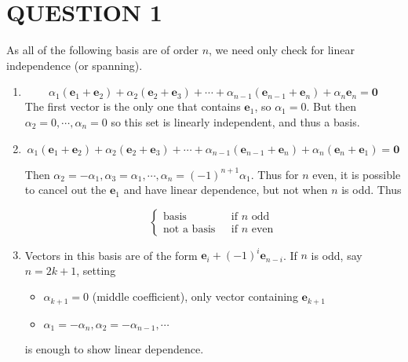 \documentclass[a4paper]{article}
\begin{document}
	
	\maketitle
	
	\section{QUESTION 1}
	
	As all of the following basis are of order $ n $, we need only check for linear independence (or spanning).
	
	\begin{enumerate}[label = (\alph*)]
		\item  \[ \alpha_{1} (\mathbf{e}_{1} + \mathbf{e}_{2}) + \alpha_{2} (\mathbf{e}_{2} + \mathbf{e}_{3}) + \cdots + \alpha_{n-1} ( \mathbf{e}_{n-1} + \mathbf{e}_{n}) + \alpha_{n} \mathbf{e}_{n} = \mathbf{0}  \]
		The first vector is the only one that contains $ \mathbf{e}_{1} $, so $ \alpha_{1} = 0 $. But then $ \alpha_{2} = 0, \cdots, \alpha_{n} = 0 $ so this set is linearly independent, and thus a basis.
		
		\item \[ \alpha_{1} (\mathbf{e}_{1} + \mathbf{e}_{2}) + \alpha_{2} (\mathbf{e}_{2} + \mathbf{e}_{3}) + \cdots + \alpha_{n-1} ( \mathbf{e}_{n-1} + \mathbf{e}_{n}) + \alpha_{n} (\mathbf{e}_{n} + \mathbf{e}_{1} ) = \mathbf{0}  \]
		
		Then $ \alpha_{2} = - \alpha_{1}, \alpha_{3} = \alpha_{1}, \cdots, \alpha_{n} = (-1)^{n+1}\alpha_{1} $. Thus for $ n $ even, it is possible to cancel out the $ \mathbf{e}_{1} $ and have linear dependence, but not when $ n $ is odd. Thus
		
		\[ \begin{cases} \text{basis }  & \text{ if } n \text{ odd } \\ \text{not a basis } &  \text{ if } n \text{ even} \end{cases} \]
		
		\item Vectors in this basis are of the form $ \mathbf{e}_{i} + (-1)^{i} \mathbf{e}_{n-i} $. If $ n $ is odd, say $ n = 2k + 1 $, setting 
		
		\begin{itemize}
			\item $ \alpha_{k+1} = 0 $ (middle coefficient), only vector containing $ \mathbf{e}_{k+1} $
			\item $ \alpha_{1} = - \alpha_{n}, \alpha_{2} = - \alpha_{n-1}, \cdots $ 
		\end{itemize}
		is enough to show linear dependence.
		

\end{enumerate}
\end{document}
